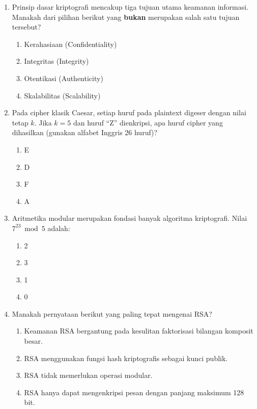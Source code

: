 \documentclass[12pt]{article}
\begin{document}
\begin{enumerate}[label=\textbf{Soal \arabic*.}, leftmargin=*, itemsep=1.5em]
    \item Prinsip dasar kriptografi mencakup tiga tujuan utama keamanan informasi. Manakah dari pilihan berikut yang \textbf{bukan} merupakan salah satu tujuan tersebut?
    \begin{enumerate}[label=\Alph*.]
        \item Kerahasiaan (Confidentiality)
        \item Integritas (Integrity)
        \item Otentikasi (Authenticity)
        \item Skalabilitas (Scalability)
    \end{enumerate}

    \item Pada cipher klasik Caesar, setiap huruf pada plaintext digeser dengan nilai tetap $k$. Jika $k = 5$ dan huruf ``Z'' dienkripsi, apa huruf cipher yang dihasilkan (gunakan alfabet Inggris 26 huruf)?
    \begin{enumerate}[label=\Alph*.]
        \item E
        \item D
        \item F
        \item A
    \end{enumerate}

    \item Aritmetika modular merupakan fondasi banyak algoritma kriptografi. Nilai $7^{23}\bmod 5$ adalah:
    \begin{enumerate}[label=\Alph*.]
        \item 2
        \item 3
        \item 1
        \item 0
    \end{enumerate}

    \item Manakah pernyataan berikut yang paling tepat mengenai RSA?
    \begin{enumerate}[label=\Alph*.]
        \item Keamanan RSA bergantung pada kesulitan faktorisasi bilangan komposit besar.
        \item RSA menggunakan fungsi hash kriptografis sebagai kunci publik.
        \item RSA tidak memerlukan operasi modular.
        \item RSA hanya dapat mengenkripsi pesan dengan panjang maksimum 128 bit.
    \end{enumerate}


\end{enumerate}
\end{document}
